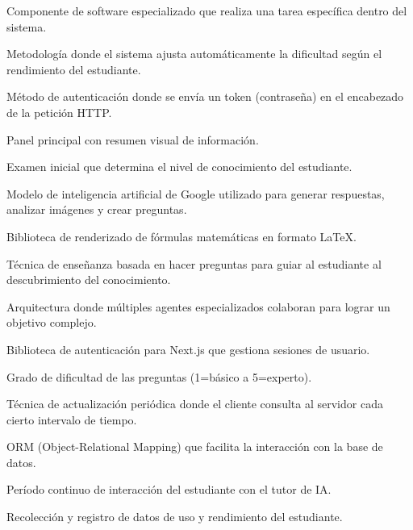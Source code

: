 \documentclass[12pt, a4paper, oneside]{book}
\begin{document}
\begin{description}[style=nextline, leftmargin=2cm]
    \item[Agente] Componente de software especializado que realiza una tarea específica dentro del sistema.
    \item[Aprendizaje Adaptativo] Metodología donde el sistema ajusta automáticamente la dificultad según el rendimiento del estudiante.
    \item[Bearer Token] Método de autenticación donde se envía un token (contraseña) en el encabezado de la petición HTTP.
    \item[Dashboard] Panel principal con resumen visual de información.
    \item[Evaluación Diagnóstica] Examen inicial que determina el nivel de conocimiento del estudiante.
    \item[Gemini] Modelo de inteligencia artificial de Google utilizado para generar respuestas, analizar imágenes y crear preguntas.
    \item[KaTeX] Biblioteca de renderizado de fórmulas matemáticas en formato LaTeX.
    \item[Método Socrático] Técnica de enseñanza basada en hacer preguntas para guiar al estudiante al descubrimiento del conocimiento.
    \item[Multiagente] Arquitectura donde múltiples agentes especializados colaboran para lograr un objetivo complejo.
    \item[NextAuth] Biblioteca de autenticación para Next.js que gestiona sesiones de usuario.
    \item[Nivel] Grado de dificultad de las preguntas (1=básico a 5=experto).
    \item[Polling] Técnica de actualización periódica donde el cliente consulta al servidor cada cierto intervalo de tiempo.
    \item[Prisma] ORM (Object-Relational Mapping) que facilita la interacción con la base de datos.
    \item[Sesión] Período continuo de interacción del estudiante con el tutor de IA.
    \item[Telemetría] Recolección y registro de datos de uso y rendimiento del estudiante.
\end{description}
\end{document}
